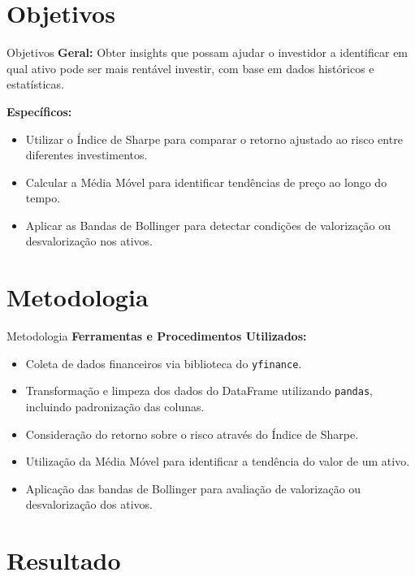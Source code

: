 \documentclass[aspectratio=169]{beamer}
\begin{document}
\section{Objetivos}
\begin{frame}{Objetivos}
  \textbf{Geral:}
  Obter insights que possam ajudar o investidor a identificar em qual ativo pode ser mais rentável investir, com base em dados históricos e estatísticas.

  \vspace{0.5cm}
  \textbf{Específicos:}
  \begin{itemize}
    \item Utilizar o Índice de Sharpe para comparar o retorno ajustado ao risco entre diferentes investimentos.
    \item Calcular a Média Móvel para identificar tendências de preço ao longo do tempo.
    \item Aplicar as Bandas de Bollinger para detectar condições de valorização ou desvalorização nos ativos.
  \end{itemize}
\end{frame}

\section{Metodologia}
\begin{frame}{Metodologia}
  \textbf{Ferramentas e Procedimentos Utilizados:}
  \begin{itemize}
    \item Coleta de dados financeiros via biblioteca do \texttt{yfinance}.
    \item Transformação e limpeza dos dados do DataFrame utilizando \texttt{pandas}, incluindo padronização das colunas.
    \item Consideração do retorno sobre o risco através do Índice de Sharpe.
    \item Utilização da Média Móvel para identificar a tendência do valor de um ativo.
    \item Aplicação das bandas de Bollinger para avaliação de valorização ou desvalorização dos ativos.
  \end{itemize}
\end{frame}

\section{Resultado}
\end{document}

